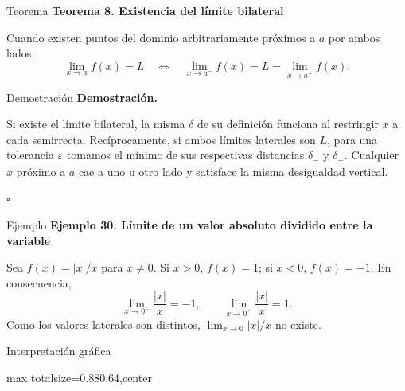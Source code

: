 \documentclass[12pt,aspectratio=169]{beamer}
\begin{document}
\begin{frame}[t,allowframebreaks]{Teorema}
{\color{azul}\bfseries Teorema 8. Existencia del límite bilateral}\par\medskip

Cuando existen puntos del dominio arbitrariamente próximos a $a$ por ambos lados,
\[
 \boxed{\lim_{x\to a}f(x)=L\quad\Longleftrightarrow\quad
 \lim_{x\to a^-}f(x)=L=\lim_{x\to a^+}f(x).}
\]
\end{frame}


\begin{frame}[t,allowframebreaks]{Demostración}
{\color{azul}\bfseries Demostración.}\par\smallskip

Si existe el límite bilateral, la misma $\delta$ de su definición funciona al restringir $x$ a cada semirrecta. Recíprocamente, si ambos límites laterales son $L$, para una tolerancia $\varepsilon$ tomamos el mínimo de sus respectivas distancias $\delta_-$ y $\delta_+$. Cualquier $x$ próximo a $a$ cae a uno u otro lado y satisface la misma desigualdad vertical.

\hfill $\square$
\end{frame}


\begin{frame}[t,allowframebreaks]{Ejemplo}
{\color{azul}\bfseries Ejemplo 30. Límite de un valor absoluto dividido entre la variable}\par\medskip

Sea $f(x)=|x|/x$ para $x\ne0$. Si $x>0$, $f(x)=1$; si $x<0$, $f(x)=-1$. En consecuencia,
\[
 \lim_{x\to0^-}\frac{|x|}{x}=-1,\qquad
 \lim_{x\to0^+}\frac{|x|}{x}=1.
\]
Como los valores laterales son distintos, $\lim_{x\to0}|x|/x$ no existe.
\end{frame}


\begin{frame}[t,allowframebreaks]{Interpretación gráfica}
\begin{center}
\begin{adjustbox}{max totalsize={0.88\linewidth}{0.64\textheight},center}\end{adjustbox}
\end{center}
\end{frame}
\end{document}

